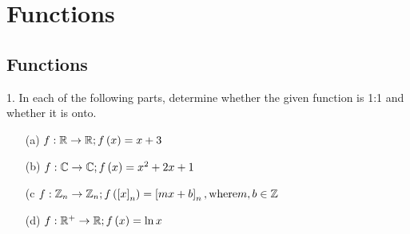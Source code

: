 
\section{Functions}  
\subsection{Functions}
\begin{mdframed}[style=darkQuesion]
  1.   In each of the following parts, determine whether the given function is 
  1:1 and whether it is onto. 
\begin{itemize}
  \item [(a)]{
    $f:\mathbb{R}\to \mathbb{R}; f\left(x\right)=x+3$
  }
  \item [(b)]{
    $f:\mathbb{C}\to \mathbb{C}; f\left(x\right)=x^2+2x+1$
  }
  \item [(c]{
    $f:\mathbb{Z}_n\to \mathbb{Z}_n; f\left(\left[x\right]_n\right)=\left[mx+b\right]_n, \text{where} m,b\in \mathbb{Z}$
  }
  \item [(d)]{
    $f:\mathbb{R}^+\to \mathbb{R}; f\left(x\right)=\ln x$
  }
\end{itemize}
\end{mdframed}

